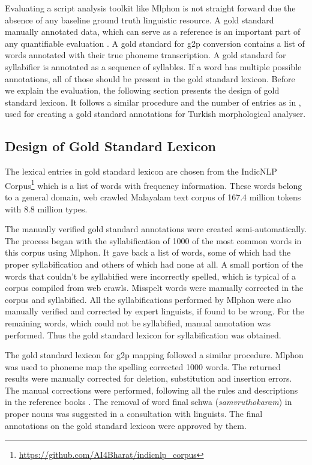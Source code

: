 Evaluating a script analysis toolkit like Mlphon is not straight forward due
the absence of any baseline ground truth linguistic resource. A gold standard
manually annotated data, which can serve as a reference is an important
part of any quantifiable evaluation \cite{kayabacs2019trmor}. A gold standard
for \gls{g2p} conversion contains a list of words annotated with their true phoneme
transcription. A gold standard for syllabifier is annotated as a sequence of
syllables. If a word has multiple possible annotations, all of those should be
present in the gold standard lexicon. Before we explain the evaluation, the
following section presents the design of gold standard lexicon. It follows a
similar procedure and the number of entries as in \cite{kayabacs2019trmor},
used for creating a gold standard annotations for Turkish morphological
analyser.

\subsection{Design of Gold Standard Lexicon}

The lexical entries in gold standard lexicon are chosen from the IndicNLP
Corpus\footnote{\url{https://github.com/AI4Bharat/indicnlp_corpus}}
\cite{kunchukuttan2020ai4bharat} which is a list of words with frequency
information. These words belong to a general domain, web crawled Malayalam text
corpus of 167.4 million tokens with 8.8 million types.

The manually verified gold standard annotations were created
semi-automatically. The process began with the syllabification of 1000 of the
most common words in this corpus using Mlphon. It gave back a list of words,
some of which had the proper syllabification and others of which had none at
all. A small portion of the words that couldn't be syllabified were incorrectly
spelled, which is typical of a corpus compiled from web crawls. Misspelt words
were manually corrected in the corpus and syllabified. All the syllabifications
performed by Mlphon were also manually verified and corrected by expert
linguists, if found to be wrong. For the remaining words, which could not be
syllabified, manual annotation was performed. Thus the gold standard lexicon
for syllabification was obtained.

The gold standard lexicon for \gls{g2p} mapping followed a similar procedure. Mlphon
was used to phoneme map the spelling corrected 1000 words. The returned results
were manually corrected for deletion, substitution and insertion errors. The
manual corrections were performed, following all the rules and descriptions in
the reference books \cite{asher1997,prabo2016}. The removal of word final schwa
(\textit{samvruthokaram}) in proper nouns was suggested in a consultation with
linguists. The final annotations on the gold standard lexicon were approved by
them.

